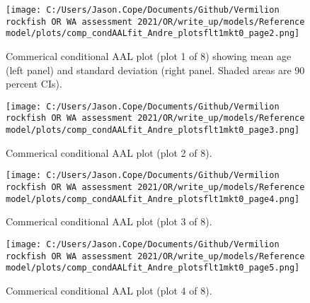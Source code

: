 \documentclass[11pt,
  english,
  a4paper,
]{article}
\begin{document}
\leavevmode\tagmcend\tagstructend


\begin{figure}
\centering
\texttt{[image: C:/Users/Jason.Cope/Documents/Github/Vermilion rockfish OR WA assessment 2021/OR/write\_up/models/Reference model/plots/comp\_condAALfit\_Andre\_plotsflt1mkt0\_page2.png]}
\caption{Commerical conditional AAL plot (plot 1 of 8) showing mean age (left panel) and standard deviation (right panel. Shaded areas are 90 percent CIs).\label{fig:comp_condAALfit_Andre_plotsflt1mkt0_page2}}
\end{figure}

\tagmcend\tagstructend


\begin{figure}
\centering
\texttt{[image: C:/Users/Jason.Cope/Documents/Github/Vermilion rockfish OR WA assessment 2021/OR/write\_up/models/Reference model/plots/comp\_condAALfit\_Andre\_plotsflt1mkt0\_page3.png]}
\caption{Commerical conditional AAL plot (plot 2 of 8).\label{fig:comp_condAALfit_Andre_plotsflt1mkt0_page3}}
\end{figure}

\tagmcend\tagstructend


\begin{figure}
\centering
\texttt{[image: C:/Users/Jason.Cope/Documents/Github/Vermilion rockfish OR WA assessment 2021/OR/write\_up/models/Reference model/plots/comp\_condAALfit\_Andre\_plotsflt1mkt0\_page4.png]}
\caption{Commerical conditional AAL plot (plot 3 of 8).\label{fig:comp_condAALfit_Andre_plotsflt1mkt0_page4}}
\end{figure}

\tagmcend\tagstructend


\begin{figure}
\centering
\texttt{[image: C:/Users/Jason.Cope/Documents/Github/Vermilion rockfish OR WA assessment 2021/OR/write\_up/models/Reference model/plots/comp\_condAALfit\_Andre\_plotsflt1mkt0\_page5.png]}
\caption{Commerical conditional AAL plot (plot 4 of 8).\label{fig:comp_condAALfit_Andre_plotsflt1mkt0_page5}}
\end{figure}
\end{document}

